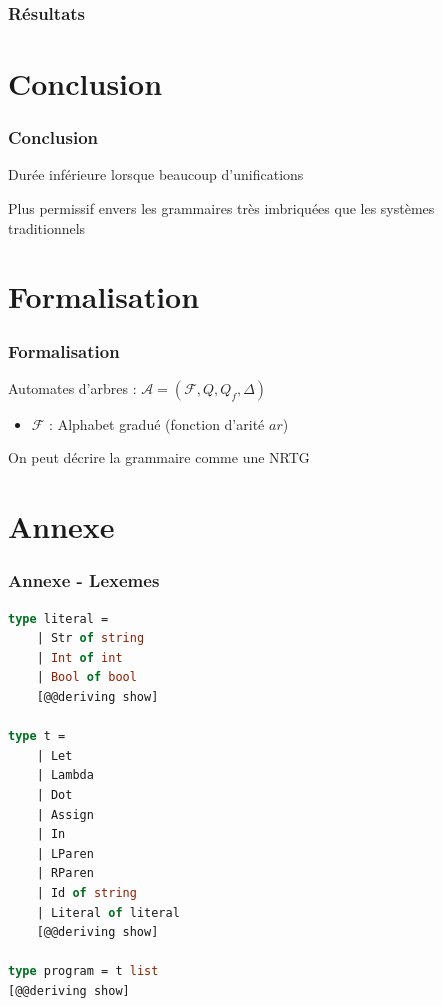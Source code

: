 \documentclass{beamer}
\begin{document}
\begin{frame}
		\frametitle{Résultats}
		\begin{center}
		\end{center}
\end{frame}


\section{Conclusion}
\begin{frame}
		\frametitle{Conclusion}
		\begin{tcolorbox}[title=Bénéfices]
				Durée inférieure lorsque beaucoup d'unifications
		\end{tcolorbox}
		\begin{tcolorbox}
				Plus permissif envers les grammaires très imbriquées que les systèmes traditionnels
		\end{tcolorbox}
\end{frame}

\section{Formalisation}
\begin{frame}
		\frametitle{Formalisation}
		Automates d'arbres : $\mathcal A  = (\mathcal F, Q, Q_f, \Delta)$\\
		\begin{itemize}
				\item{$\mathcal F$ : Alphabet gradué (fonction d'arité $ar$) }
		\end{itemize}
		On peut décrire la grammaire comme une NRTG
\end{frame}

\section{Annexe}
\begin{frame}[fragile]
		\frametitle{Annexe - Lexemes}
		\begin{lstlisting}[language=ML]
type literal = 
    | Str of string
    | Int of int
    | Bool of bool
    [@@deriving show]

type t =
    | Let
    | Lambda
    | Dot
    | Assign
    | In
    | LParen
    | RParen
    | Id of string
    | Literal of literal
    [@@deriving show]

type program = t list
[@@deriving show]
		\end{lstlisting}
\end{frame}
\end{document}
